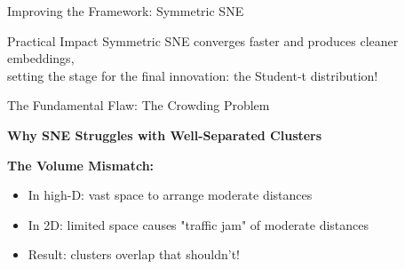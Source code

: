 \documentclass[10pt]{beamer}
\begin{document}
\begin{frame}{Improving the Framework: Symmetric SNE}
\vspace{0.1cm}
\begin{exampleblock}{Practical Impact}
\footnotesize
Symmetric SNE converges faster and produces cleaner embeddings,\\
setting the stage for the final innovation: the Student-t distribution!
\end{exampleblock}

\end{frame}

\begin{frame}{The Fundamental Flaw: The Crowding Problem}

\begin{center}
\textbf{\large Why SNE Struggles with Well-Separated Clusters}
\end{center}

\vspace{0.1cm}
\textbf{The Volume Mismatch:}
\begin{itemize}
    \setlength\itemsep{-0.1em}
    \item In high-D: vast space to arrange moderate distances
    \item In 2D: limited space causes "traffic jam" of moderate distances
    \item Result: clusters overlap that shouldn't!
\end{itemize}

\vspace{0.1cm}
\begin{figure}
\centering
{}
\end{figure}
\end{frame}
\end{document}
